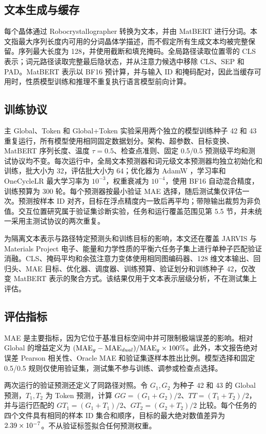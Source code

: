 \documentclass[a4paper,fleqn]{cas-sc}
\renewcommand{\times}{\mathbin{\hbox{\normalfont ×}}}
\begin{document}
\subsection{文本生成与缓存}
每个晶体通过 Robocrystallographer 转换为文本，并由 MatBERT 进行分词。本文指最大序列长度内可用的分词晶体学描述，而不假定所有生成文本均被完整保留。序列最大长度为 128，并使用截断和填充掩码。全局路径读取位置零的 CLS 表示；词元路径读取完整最后隐状态，并从注意力候选中移除 CLS、SEP 和 PAD。MatBERT 表示以 BF16 预计算，并与输入 ID 和掩码配对，因此当缓存可用时，性质模型训练和推理不重复执行语言模型前向计算。

\subsection{训练协议}
主 Global、Token 和 Global+Token 实验采用两个独立的模型训练种子 42 和 43 重复运行，所有模型使用相同固定数据划分。架构、超参数、目标变换、MatBERT 序列长度、温度 $\tau=0.5$、检查点准则、固定 0.5/0.5 预测级平均和测试协议均不变。每次运行中，全局文本预测器和词元级文本预测器均独立初始化和训练，批大小为 32，评估批大小为 64；优化器为 AdamW \citep{loshchilov2019adamw}，学习率和 OneCycleLR 最大学习率为 $10^{-3}$，权重衰减为 $10^{-4}$，使用 BF16 自动混合精度，训练预算为 300 轮。每个预测器按最小验证 MAE 选择，随后测试集仅评估一次。预测按样本 ID 对齐，目标在浮点精度内一致后再平均；带隙输出裁剪为非负值。交互位置研究属于验证集诊断实验，任务和运行覆盖范围见第 5.5 节，并未统一采用主测试协议的两次重复。

为隔离文本表示与路径特定预测头和训练目标的影响，本文还在覆盖 JARVIS 与 Materials Project 电子、能量和力学性质的平衡六任务子集上进行单种子匹配验证消融。CLS、掩码平均和余弦注意力变体使用相同图编码器、128 维文本输出、回归头、MAE 目标、优化器、调度器、训练预算、验证划分和训练种子 42，仅改变 MatBERT 表示的聚合方式。该结果仅用于文本表示层级分析，不在测试集上评估。

\subsection{评估指标}
MAE 是主要指标，因为它位于基准目标空间中并可限制极端误差的影响。相对 Global 的增益定义为 $(\mathrm{MAE}_g-\mathrm{MAE}_{dual})/\mathrm{MAE}_g\times100\%$。此外，本文报告绝对误差 Pearson 相关性、Oracle MAE 和验证集逐样本胜出比例。模型选择和固定 0.5/0.5 规则仅使用验证集，测试集不参与训练、调参或检查点选择。

两次运行的验证预测还定义了同路径对照。令 $G_1,G_2$ 为种子 42 和 43 的 Global 预测，$T_1,T_2$ 为 Token 预测，计算 $GG=(G_1+G_2)/2$、$TT=(T_1+T_2)/2$，并与运行匹配的 $GT_1=(G_1+T_1)/2$、$GT_2=(G_2+T_2)/2$ 比较。每个任务的四个文件具有相同的样本 ID 集合和顺序，目标的最大绝对数值差异为 $2.39\times10^{-7}$。不从验证标签拟合任何预测权重。
\end{document}
